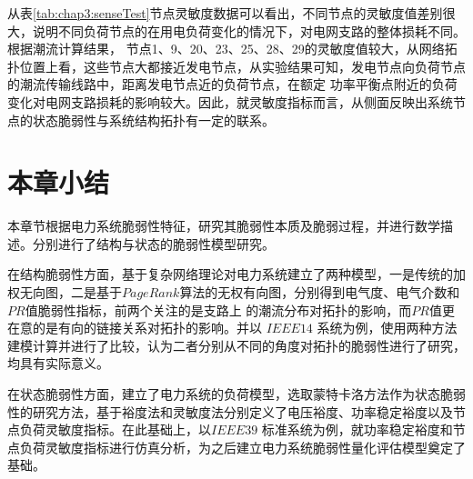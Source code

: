 从表\ref{tab:chap3:senseTest}节点灵敏度数据可以看出，不同节点的灵敏度值差别很大，说明不同负荷节点的在用电负荷变化的情况下，对电网支路的整体损耗不同。根据潮流计算结果，
节点1、9、20、23、25、28、29的灵敏度值较大，从网络拓扑位置上看，这些节点大都接近发电节点，从实验结果可知，发电节点向负荷节点的潮流传输线路中，距离发电节点近的负荷节点，在额定
功率平衡点附近的负荷变化对电网支路损耗的影响较大。因此，就灵敏度指标而言，从侧面反映出系统节点的状态脆弱性与系统结构拓扑有一定的联系。




\section{本章小结}
\label{sec:sum3}

本章节根据电力系统脆弱性特征，研究其脆弱性本质及脆弱过程，并进行数学描述。分别进行了结构与状态的脆弱性模型研究。

在结构脆弱性方面，基于复杂网络理论对电力系统建立了两种模型，一是传统的加权无向图，二是基于$PageRank$算法的无权有向图，分别得到电气度、电气介数和$PR$值脆弱性指标，前两个关注的是支路上
的潮流分布对拓扑的影响，而$PR$值更在意的是有向的链接关系对拓扑的影响。并以 $IEEE14$ 系统为例，使用两种方法建模计算并进行了比较，认为二者分别从不同的角度对拓扑的脆弱性进行了研究，
均具有实际意义。

在状态脆弱性方面，建立了电力系统的负荷模型，选取蒙特卡洛方法作为状态脆弱性的研究方法，基于裕度法和灵敏度法分别定义了电压裕度、功率稳定裕度以及节点负荷灵敏度指标。在此基础上，以$IEEE39$
标准系统为例，就功率稳定裕度和节点负荷灵敏度指标进行仿真分析，为之后建立电力系统脆弱性量化评估模型奠定了基础。



